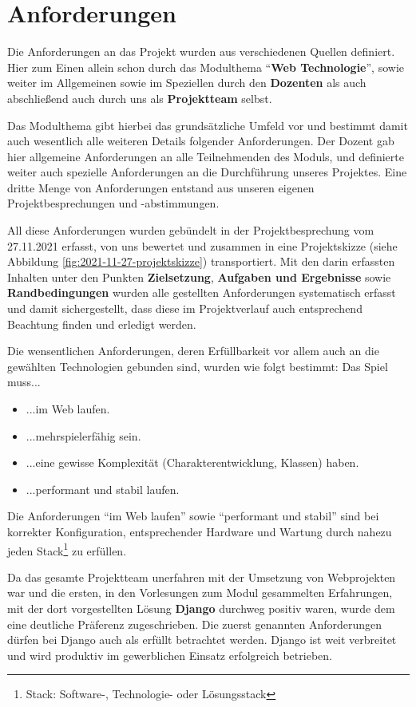 
\section{Anforderungen} \label{anforderungen}

Die Anforderungen an das Projekt wurden aus verschiedenen Quellen definiert. Hier zum Einen allein schon durch das Modulthema \enquote{\textbf{Web Technologie}}, sowie weiter im Allgemeinen sowie im Speziellen durch den \textbf{Dozenten} als auch abschließend auch durch uns als \textbf{Projektteam} selbst. 

Das Modulthema gibt hierbei das grundsätzliche Umfeld vor und bestimmt damit auch wesentlich alle weiteren Details folgender Anforderungen. Der Dozent gab hier allgemeine Anforderungen an alle Teilnehmenden des Moduls, und definierte weiter auch spezielle Anforderungen an die Durchführung unseres Projektes. Eine dritte Menge von Anforderungen entstand aus unseren eigenen Projektbesprechungen und -abstimmungen.  

All diese Anforderungen wurden gebündelt in der Projektbesprechung vom 27.11.2021 erfasst, von uns bewertet und zusammen in eine Projektskizze (siehe Abbildung  \ref{fig:2021-11-27-projektskizze}) transportiert. Mit den darin erfassten Inhalten unter den Punkten \textbf{Zielsetzung}, \textbf{Aufgaben und Ergebnisse} sowie \textbf{Randbedingungen} wurden alle gestellten Anforderungen systematisch erfasst und damit sichergestellt, dass diese im Projektverlauf auch entsprechend Beachtung finden und erledigt werden. 


Die wensentlichen Anforderungen, deren Erfüllbarkeit vor allem auch an die gewählten Technologien gebunden sind, wurden wie folgt bestimmt: Das Spiel muss... \begin{itemize}
    \item ...im Web laufen.
    \item ...mehrspielerfähig sein.
    \item ...eine gewisse Komplexität (Charakterentwicklung, Klassen) haben.
    \item ...performant und stabil laufen.
\end{itemize}


Die Anforderungen \enquote{im Web laufen} sowie \enquote{performant und stabil} sind bei korrekter Konfiguration, entsprechender Hardware und Wartung durch nahezu jeden Stack\footnote{Stack: Software-, Technologie- oder Lösungsstack} zu erfüllen. 

Da das gesamte Projektteam unerfahren mit der Umsetzung von Webprojekten war und die ersten, in den Vorlesungen zum Modul gesammelten Erfahrungen, mit der dort vorgestellten Lösung \textbf{Django} durchweg positiv waren, wurde dem eine deutliche Präferenz zugeschrieben. Die zuerst genannten Anforderungen dürfen bei Django auch als erfüllt betrachtet werden. Django ist weit verbreitet und wird produktiv im gewerblichen Einsatz erfolgreich betrieben. 

